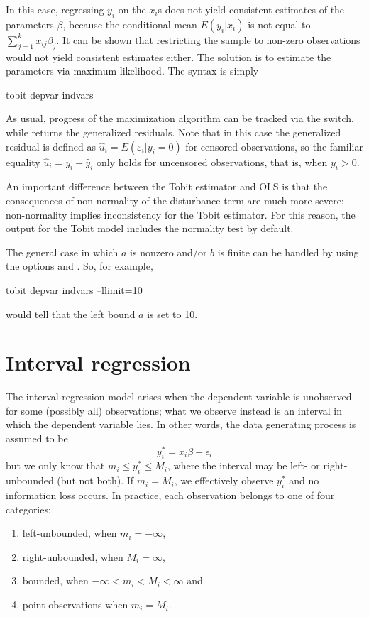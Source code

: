 In this case, regressing $y_i$ on the $x_i$s does not yield consistent
estimates of the parameters $\beta$, because the conditional mean
$E(y_i|x_i)$ is not equal to $\sum_{j=1}^k x_{ij} \beta_j$.  It can be
shown that restricting the sample to non-zero observations would not
yield consistent estimates either. The solution is to estimate the
parameters via maximum likelihood. The syntax is simply
\begin{code}
tobit depvar indvars
\end{code}

As usual, progress of the maximization algorithm can be tracked via
the  switch, while  returns the
generalized residuals. Note that in this case the generalized residual
is defined as $\hat{u}_i = E(\varepsilon_i | y_i = 0)$ for censored
observations, so the familiar equality $\hat{u}_i = y_i - \hat{y}_i$
only holds for uncensored observations, that is, when $y_i>0$.

An important difference between the Tobit estimator and OLS is that
the consequences of non-normality of the disturbance term are much
more severe: non-normality implies inconsistency for the Tobit
estimator. For this reason, the output for the Tobit model includes
the \cite{chesher-irish87} normality test by default.

The general case in which $a$ is nonzero and/or $b$ is finite can be
handled by using the options  and . So,
for example,
\begin{code}
tobit depvar indvars --llimit=10
\end{code}
would tell  that the left bound $a$ is set to 10.

\section{Interval regression}
\label{sec:intreg}

The interval regression model arises when the dependent variable is
unobserved for some (possibly all) observations; what we observe
instead is an interval in which the dependent variable lies.  In other
words, the data generating process is assumed to be
\[
  y^*_i = x_i \beta + \epsilon_i
\] 
but we only know that $m_i \le y^*_i \le M_i$, where the interval may
be left- or right-unbounded (but not both). If $m_i = M_i$, we
effectively observe $y^*_i$ and no information loss occurs. In
practice, each observation belongs to one of four categories:
\begin{enumerate}
\item left-unbounded, when $m_i = -\infty$,
\item right-unbounded, when $M_i = \infty$,
\item bounded, when $-\infty < m_i < M_i <\infty$ and
\item point observations when $m_i = M_i$.
\end{enumerate}

